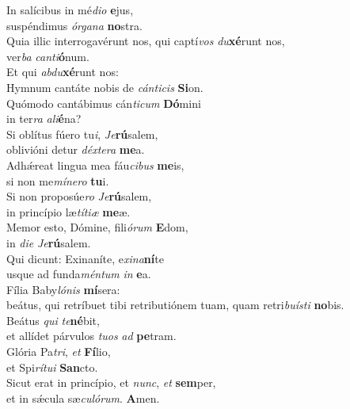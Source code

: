 \evenverse In salícibus in mé\textit{di}\textit{o} \textbf{e}jus,~\*\\
\evenverse suspéndimus \textit{ór}\textit{ga}\textit{na} \textbf{no}stra.\\
\oddverse Quia illic interrogavérunt nos, qui captí\textit{vos} \textit{du}\textbf{xé}runt nos,~\*\\
\oddverse ver\textit{ba} \textit{can}\textit{ti}\textbf{ó}num.\\
\evenverse Et qui \textit{ab}\textit{du}\textbf{xé}runt nos:~\*\\
\evenverse Hymnum cantáte nobis de \textit{cán}\textit{ti}\textit{cis} \textbf{Si}on.\\
\oddverse Quómodo cantábimus cán\textit{ti}\textit{cum} \textbf{Dó}mini~\*\\
\oddverse in ter\textit{ra} \textit{a}\textit{li}\textbf{é}na?\\
\evenverse Si oblítus fúero tu\textit{i}, \textit{Je}\textbf{rú}salem,~\*\\
\evenverse oblivióni detur \textit{déx}\textit{te}\textit{ra} \textbf{me}a.\\
\oddverse Adhǽreat lingua mea fáu\textit{ci}\textit{bus} \textbf{me}is,~\*\\
\oddverse si non me\textit{mí}\textit{ne}\textit{ro} \textbf{tu}i.\\
\evenverse Si non proposúe\textit{ro} \textit{Je}\textbf{rú}salem,~\*\\
\evenverse in princípio læ\textit{tí}\textit{ti}\textit{æ} \textbf{me}æ.\\
\oddverse Memor esto, Dómine, fili\textit{ó}\textit{rum} \textbf{E}dom,~\*\\
\oddverse in \textit{di}\textit{e} \textit{Je}\textbf{rú}salem.\\
\evenverse Qui dicunt: Exinaníte, e\textit{xi}\textit{na}\textbf{ní}te~\*\\
\evenverse usque ad funda\textit{mén}\textit{tum} \textit{in} \textbf{e}a.\\
\oddverse Fília Baby\textit{ló}\textit{nis} \textbf{mí}sera:~\*\\
\oddverse beátus, qui retríbuet tibi retributiónem tuam, quam retri\textit{bu}\textit{í}\textit{sti} \textbf{no}bis.\\
\evenverse Beátus \textit{qui} \textit{te}\textbf{né}bit,~\*\\
\evenverse et allídet párvulos \textit{tu}\textit{os} \textit{ad} \textbf{pe}tram.\\
\oddverse Glória Pa\textit{tri}, \textit{et} \textbf{Fí}lio,~\*\\
\oddverse et Spi\textit{rí}\textit{tu}\textit{i} \textbf{San}cto.\\
\evenverse Sicut erat in princípio, et \textit{nunc}, \textit{et} \textbf{sem}per,~\*\\
\evenverse et in sǽcula sæ\textit{cu}\textit{ló}\textit{rum}. \textbf{A}men.\\
